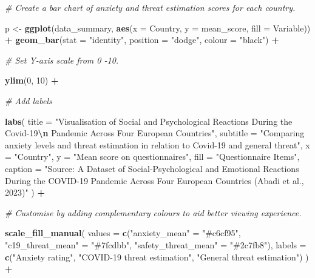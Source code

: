 \documentclass[
]{article}
\newenvironment{Shaded}{\begin{snugshade}}{\end{snugshade}}
\newcommand{\AttributeTok}[1]{\textcolor[rgb]{0.13,0.29,0.53}{#1}}
\newcommand{\CommentTok}[1]{\textcolor[rgb]{0.56,0.35,0.01}{\textit{#1}}}
\newcommand{\DecValTok}[1]{\textcolor[rgb]{0.00,0.00,0.81}{#1}}
\newcommand{\FunctionTok}[1]{\textcolor[rgb]{0.13,0.29,0.53}{\textbf{#1}}}
\newcommand{\NormalTok}[1]{#1}
\newcommand{\OtherTok}[1]{\textcolor[rgb]{0.56,0.35,0.01}{#1}}
\newcommand{\SpecialCharTok}[1]{\textcolor[rgb]{0.81,0.36,0.00}{\textbf{#1}}}
\newcommand{\StringTok}[1]{\textcolor[rgb]{0.31,0.60,0.02}{#1}}
\begin{document}
\begin{Shaded}
\begin{Highlighting}[]
\CommentTok{\# Create a bar chart of anxiety and threat estimation scores for each country.}

\NormalTok{p }\OtherTok{\textless{}{-}} \FunctionTok{ggplot}\NormalTok{(data\_summary, }\FunctionTok{aes}\NormalTok{(}\AttributeTok{x =}\NormalTok{ Country, }\AttributeTok{y =}\NormalTok{ mean\_score, }\AttributeTok{fill =}\NormalTok{ Variable)) }\SpecialCharTok{+}
  \FunctionTok{geom\_bar}\NormalTok{(}\AttributeTok{stat =} \StringTok{"identity"}\NormalTok{, }\AttributeTok{position =} \StringTok{"dodge"}\NormalTok{, }\AttributeTok{colour =} \StringTok{"black"}\NormalTok{) }\SpecialCharTok{+}
  
  \CommentTok{\# Set Y{-}axis scale from 0 {-}10. }
  
  \FunctionTok{ylim}\NormalTok{(}\DecValTok{0}\NormalTok{, }\DecValTok{10}\NormalTok{) }\SpecialCharTok{+}
  
  \CommentTok{\# Add labels}
  
  \FunctionTok{labs}\NormalTok{(}
    \AttributeTok{title =} \StringTok{"Visualisation of Social and Psychological Reactions During the Covid{-}19}\SpecialCharTok{\textbackslash{}n}\StringTok{ Pandemic Across Four European Countries"}\NormalTok{,}
    \AttributeTok{subtitle =} \StringTok{"Comparing anxiety levels and threat estimation in relation to Covid{-}19 and general threat"}\NormalTok{,}
    \AttributeTok{x =} \StringTok{"Country"}\NormalTok{,}
    \AttributeTok{y =} \StringTok{"Mean score on questionnaires"}\NormalTok{,}
    \AttributeTok{fill =} \StringTok{"Questionnaire Items"}\NormalTok{,}
    \AttributeTok{caption =} \StringTok{"Source: A Dataset of Social{-}Psychological and Emotional Reactions During the COVID{-}19 Pandemic Across Four European Countries (Abadi et al., 2023)"}
\NormalTok{  ) }\SpecialCharTok{+}
  
  \CommentTok{\# Customise by adding complementary colours to aid better viewing experience. }
  
  \FunctionTok{scale\_fill\_manual}\NormalTok{(}
    \AttributeTok{values =} \FunctionTok{c}\NormalTok{(}\StringTok{"anxiety\_mean"} \OtherTok{=} \StringTok{"\#c6cf95"}\NormalTok{, }\StringTok{"c19\_threat\_mean"} \OtherTok{=} \StringTok{"\#7fcdbb"}\NormalTok{, }\StringTok{"safety\_threat\_mean"} \OtherTok{=} \StringTok{"\#2c7fb8"}\NormalTok{),}
    \AttributeTok{labels =} \FunctionTok{c}\NormalTok{(}\StringTok{"Anxiety rating"}\NormalTok{, }\StringTok{"COVID{-}19 threat estimation"}\NormalTok{, }\StringTok{"General threat estimation"}\NormalTok{)}
\NormalTok{  ) }\SpecialCharTok{+}
  

\end{Highlighting}
\end{Shaded}
\end{document}
